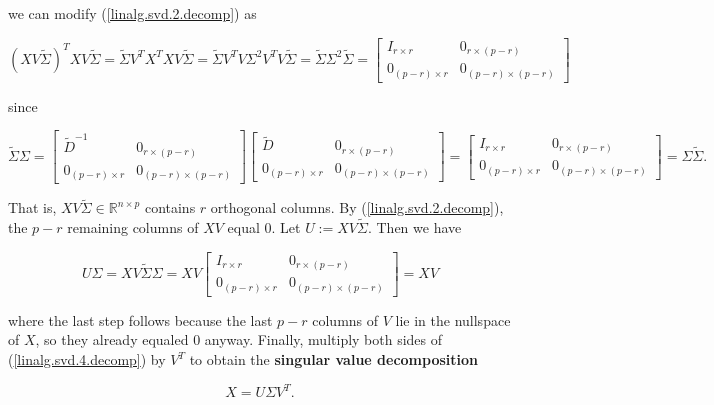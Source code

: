 we can modify (\ref{linalg.svd.2.decomp}) as

\begin{equation}\label{linalg.svd.3.decomp}
(XV \tilde{\Sigma})^T XV \tilde{\Sigma} =  \tilde{\Sigma} V^T X^TXV \tilde{\Sigma} = \tilde{\Sigma}  V^T V \Sigma^2 V^TV \tilde{\Sigma} = \tilde{\Sigma} \Sigma^2 \tilde{\Sigma} =  \begin{bmatrix} 
I_{r \times r} & 0_{r \times (p - r)} \\
0_{(p-r) \times r}  & 0_{(p-r) \times (p-r)}
\end{bmatrix} 
\end{equation}

since

\[
\tilde{\Sigma} \Sigma =  \begin{bmatrix} 
\tilde{D}^{-1} & 0_{r \times (p - r)} \\
0_{(p-r) \times r}  & 0_{(p-r) \times (p-r)}
\end{bmatrix} \begin{bmatrix} 
\tilde{D} & 0_{r \times (p - r)} \\
0_{(p-r) \times r}  & 0_{(p-r) \times (p-r)}
\end{bmatrix} = 
 \begin{bmatrix} 
I_{r \times r} & 0_{r \times (p - r)} \\
0_{(p-r) \times r}  & 0_{(p-r) \times (p-r)}
\end{bmatrix} =  \Sigma \tilde{\Sigma} .
\]

That is, \(XV \tilde{\Sigma} \in \mathbb{R}^{n \times p}\) contains \(r\) orthogonal columns. By (\ref{linalg.svd.2.decomp}), the \(p - r\) remaining columns of \(XV\) equal 0. Let \(U := XV \tilde{\Sigma}\). Then we have

\begin{equation}\label{linalg.svd.4.decomp}
U \Sigma = XV \tilde{\Sigma} \Sigma = XV  \begin{bmatrix} 
I_{r \times r} & 0_{r \times (p - r)} \\
0_{(p-r) \times r}  & 0_{(p-r) \times (p-r)}
\end{bmatrix} = XV
\end{equation}

where the last step follows because the last \(p -r\) columns of \(V\) lie in the nullspace of \(X\), so they already equaled 0 anyway. Finally, multiply both sides of (\ref{linalg.svd.4.decomp}) by \(V^T\) to obtain the \textbf{singular value decomposition}

\[
X = U \Sigma V^T.
\]

